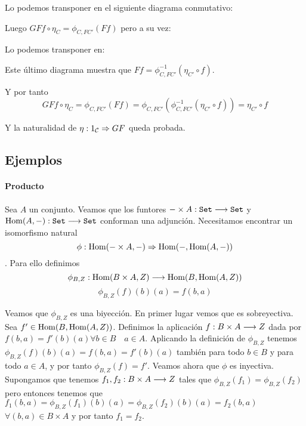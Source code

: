 Lo podemos transponer en el siguiente diagrama conmutativo:

\begin{center}
\end{center}

Luego $GFf \circ \eta_C = \phi_{C, FC'}(Ff)$ pero a su vez:


\begin{center}
\end{center}

Lo podemos transponer en:

\begin{center}
\end{center}

Este último diagrama muestra que
$Ff = \phi^{-1}_{C, FC'}(\eta_{C'} \circ f)$.


Y por tanto
$$GFf \circ \eta_C = \phi_{C, FC'}(Ff) = \phi_{C, FC'}
  (\phi^{-1}_{C,FC'}(\eta_{C'} \circ f)) = \eta_{C'} \circ f$$

Y la naturalidad de $\eta : 1_{\mathcal{C}}\Rightarrow GF$ queda probada.

\subsection{Ejemplos}
\paragraph{Producto}
Sea $A$ un conjunto. Veamos que los funtores
$-\times A : \texttt{Set}\longrightarrow \texttt{Set}$ y
$\operatorname{Hom}(A, -) : \texttt{Set}\longrightarrow \texttt{Set}$ conforman una adjunción.
Necesitamos encontrar un isomorfismo natural
$$\phi : \operatorname{Hom}(-\times A, -)\Rightarrow \operatorname{Hom}(-, \operatorname{Hom}(A, -))$$.
Para ello definimos
$$\phi_{B, Z} : \operatorname{Hom}(B\times A, Z)\longrightarrow \operatorname{Hom}(B, \operatorname{Hom}(A, Z))$$
$$\phi_{B, Z}(f)(b)(a) = f(b, a)$$

Veamos que $\phi_{B, Z}$ es una biyección.
En primer lugar vemos que es sobreyectiva.
Sea $f' \in \operatorname{Hom}(B, \operatorname{Hom}(A, Z))$. Definimos la aplicación
$f : B\times A\longrightarrow Z$ dada por $f(b, a) = f'(b)(a) \forall b\in B \quad a \in A$. Aplicando
la definición de $\phi_{B, Z}$
tenemos $\phi_{B,Z}(f)(b)(a) = f(b, a) = f'(b)(a)$ también para
todo $b \in B$ y para todo $a \in A$, y por tanto
$\phi_{B,Z}(f) = f'$. Veamos ahora que $\phi$ es inyectiva. Supongamos
que tenemos $f_1, f_2 : B\times A\longrightarrow Z$ tales que
$\phi_{B, Z}(f_1) = \phi_{B, Z}(f_2)$ pero entonces tenemos que
$f_1(b, a) = \phi_{B, Z}(f_1)(b)(a) = \phi_{B,Z}(f_2)(b)(a) = f_2(b, a)$
$\forall (b, a) \in B\times A$
y por tanto $f_1 = f_2$.

